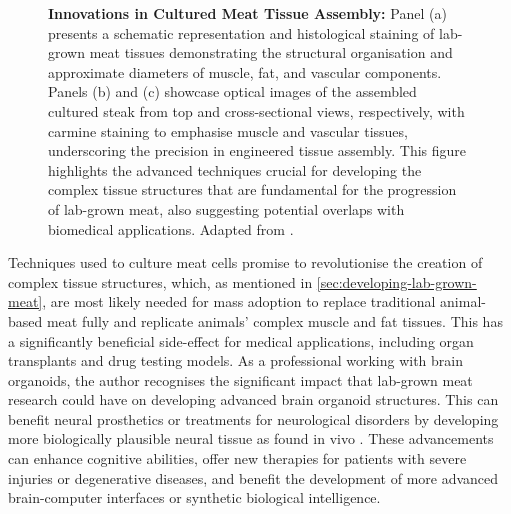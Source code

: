 \documentclass[10pt]{article}
\begin{document}
\begin{sloppypar}
  \begin{figure}[ht]
    \centering
    \caption[Innovations in Cultured Meat Tissue Assembly]{\textbf{Innovations in Cultured Meat Tissue Assembly:} Panel (a) presents a schematic representation and histological staining of lab-grown meat tissues demonstrating the structural organisation and approximate diameters of muscle, fat, and vascular components. Panels (b) and (c) showcase optical images of the assembled cultured steak from top and cross-sectional views, respectively, with carmine staining to emphasise muscle and vascular tissues, underscoring the precision in engineered tissue assembly. This figure highlights the advanced techniques crucial for developing the complex tissue structures that are fundamental for the progression of lab-grown meat, also suggesting potential overlaps with biomedical applications. Adapted from \cite{kang_engineered_2021}.}
    \label{fig:lab-grown-fiber}
  \end{figure}


  Techniques used to culture meat cells promise to revolutionise the creation of complex tissue structures, which, as mentioned in \autoref{sec:developing-lab-grown-meat}, are most likely needed for mass adoption to replace traditional animal-based meat fully and replicate animals’ complex muscle and fat tissues. This has a significantly beneficial side-effect for medical applications, including organ transplants and drug testing models. As a professional working with brain organoids, the author recognises the significant impact that lab-grown meat research could have on developing advanced brain organoid structures. This can benefit neural prosthetics or treatments for neurological disorders by developing more biologically plausible neural tissue as found in vivo \citep{sharma_3d_2020}. These advancements can enhance cognitive abilities, offer new therapies for patients with severe injuries or degenerative diseases, and benefit the development of more advanced brain-computer interfaces or synthetic biological intelligence.


\end{sloppypar}
\end{document}
